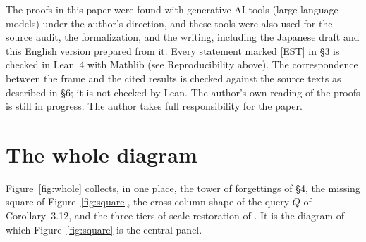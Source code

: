 \documentclass[11pt]{article}
\theoremstyle{plain}
\theoremstyle{definition}
\theoremstyle{remark}
\newcommand{\EST}{\textup{[EST]}}
\begin{document}
The proofs in this paper were found with generative AI tools (large
language models) under the author's direction, and these tools were
also used for the source audit, the formalization, and the writing,
including the Japanese draft and this English version prepared from
it.  Every statement marked \EST{} in \S3 is checked in Lean~4 with
Mathlib (see Reproducibility above).  The correspondence between
the frame and the cited results is checked against the source texts
as described in \S6; it is not checked by Lean.  The author's own
reading of the proofs is still in progress.  The author takes full
responsibility for the paper.

\appendix
\section{The whole diagram}

Figure~\ref{fig:whole} collects, in one place, the tower of
forgettings of \S4, the missing square of Figure~\ref{fig:square},
the cross-column shape of the query $Q$ of Corollary~3.12, and the
three tiers of scale restoration of \cite[Thm.~6.4]{FrdI}.  It is
the diagram of which Figure~\ref{fig:square} is the central panel.
\end{document}
